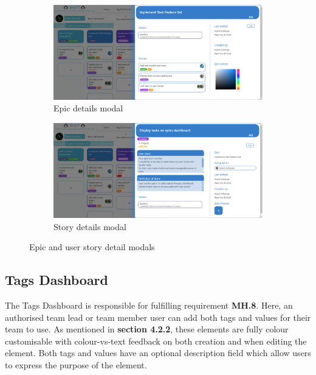 \documentclass[l4proj.tex]{subfiles}
\begin{document}
\begin{figure}[h!]
\centering
\begin{subfigure}{.5\textwidth}
\centering
\includegraphics[scale=0.17]{dissertation/images/EpicDetails.png}
\caption{Epic details modal}
\end{subfigure}%
\begin{subfigure}{.5\textwidth}
\centering
\includegraphics[scale=0.17]{dissertation/images/StoryDetails.png}
\caption{Story details modal}
\end{subfigure}

\caption{Epic and user story detail modals}
\label{fig:detail modals}
\end{figure}

\subsection{Tags Dashboard}
The Tags Dashboard is responsible for fulfilling requirement \textbf{MH.8}. Here, an authorised team lead or team member user can add both tags and values for their team to use. As mentioned in \textbf{section 4.2.2}, these elements are fully colour customisable with colour-vs-text feedback on both creation and when editing the element. Both tags and values have an optional description field which allow users to express the purpose of the element. 
\end{document}
